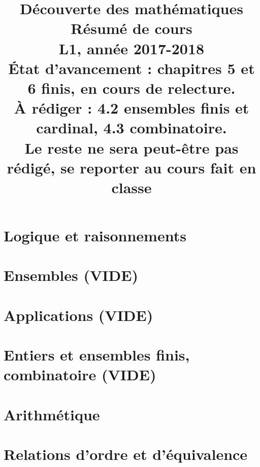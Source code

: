 \documentclass[11pt,a4paper]{book}
\theoremstyle{definition}
\begin{document}
\title{Découverte des mathématiques\\
Résumé de cours\\
L1, année 2017-2018\\
{\small 
\'Etat d'avancement : chapitres 5 et 6 finis, en cours de relecture.\\ À rédiger : 4.2 ensembles finis et cardinal, 4.3 combinatoire.\\ Le reste ne sera peut-être pas rédigé, se reporter au cours fait en classe}}
\maketitle


\tableofcontents





\chapter{Logique et raisonnements}


\chapter{Ensembles (VIDE)}


\chapter{Applications (VIDE)}


\chapter{Entiers et ensembles finis, combinatoire (VIDE)}


\chapter{Arithmétique}


\chapter{Relations d'ordre et d'équivalence}

\end{document}
